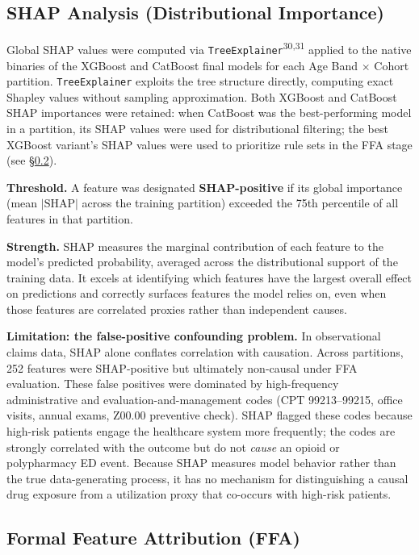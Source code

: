 \documentclass[
  12pt,
]{book}
\begin{document}
\subsection{SHAP Analysis (Distributional
Importance)}\label{shap-analysis-distributional-importance}

Global SHAP values were computed via
\texttt{TreeExplainer}\textsuperscript{30,31} applied to the native
binaries of the XGBoost and CatBoost final models for each Age Band
\(\times\) Cohort partition. \texttt{TreeExplainer} exploits the tree
structure directly, computing exact Shapley values without sampling
approximation. Both XGBoost and CatBoost SHAP importances were retained:
when CatBoost was the best-performing model in a partition, its SHAP
values were used for distributional filtering; the best XGBoost
variant's SHAP values were used to prioritize rule sets in the FFA stage
(see §\ref{sec-ffa}).

\textbf{Threshold.} A feature was designated \textbf{SHAP-positive} if
its global importance (mean \(|\text{SHAP}|\) across the training
partition) exceeded the 75th percentile of all features in that
partition.

\textbf{Strength.} SHAP measures the marginal contribution of each
feature to the model's predicted probability, averaged across the
distributional support of the training data. It excels at identifying
which features have the largest overall effect on predictions and
correctly surfaces features the model relies on, even when those
features are correlated proxies rather than independent causes.

\textbf{Limitation: the false-positive confounding problem.} In
observational claims data, SHAP alone conflates correlation with
causation. Across partitions, 252 features were SHAP-positive but
ultimately non-causal under FFA evaluation. These false positives were
dominated by high-frequency administrative and evaluation-and-management
codes (CPT 99213--99215, office visits, annual exams, Z00.00 preventive
check). SHAP flagged these codes because high-risk patients engage the
healthcare system more frequently; the codes are strongly correlated
with the outcome but do not \emph{cause} an opioid or polypharmacy ED
event. Because SHAP measures model behavior rather than the true
data-generating process, it has no mechanism for distinguishing a causal
drug exposure from a utilization proxy that co-occurs with high-risk
patients.

\subsection{Formal Feature Attribution (FFA)}\label{sec-ffa}
\end{document}
